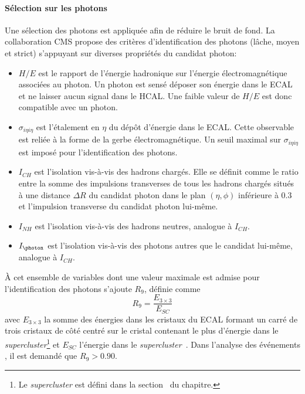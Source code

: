 \paragraph{Sélection sur les photons}
Une sélection des photons est appliquée afin de réduire le bruit de fond.
La collaboration CMS propose des critères d'identification des photons (lâche, moyen et strict) s'appuyant sur diverses propriétés du \og candidat \fg{} photon:
\begin{itemize}
\item $H/E$ est le rapport de l'énergie hadronique sur l'énergie électromagnétique associées au photon.
Un photon est sensé déposer son énergie dans le ECAL et ne laisser aucun signal dans le HCAL.
Une faible valeur de $H/E$ est donc compatible avec un photon.
\item $\sigma_{i\eta i\eta}$ est l'étalement en $\eta$ du dépôt d'énergie dans le ECAL.
Cette observable est reliée à la forme de la gerbe électromagnétique.
Un seuil maximal sur $\sigma_{i\eta i\eta}$ est imposé pour l'identification des photons.
\item $I_{CH}$ est l'isolation vis-à-vis des hadrons chargés.
Elle se définit comme le ratio entre la somme des impulsions transverses de tous les hadrons chargés situés à une distance $\Delta R$ du candidat photon dans le plan $(\eta,\phi)$ inférieure à \num{0.3} et l'impulsion transverse du candidat photon lui-même.
\item $I_{NH}$ est l'isolation vis-à-vis des hadrons neutres, analogue à $I_{CH}$.
\item $I_{\photon}$ est l'isolation vis-à-vis des photons autres que le candidat lui-même, analogue à $I_{CH}$.
\end{itemize}
À cet ensemble de variables dont une valeur maximale est admise pour l'identification des photons s'ajoute $R_9$, définie comme
\begin{equation}
R_9 = \frac{E_{3\times3}}{E_{SC}}
\label{eq-R9_definition}
\end{equation}
avec
$E_{3\times3}$ la somme des énergies dans les cristaux du ECAL formant un carré de trois cristaux de côté centré sur le cristal contenant le plus d'énergie dans le \emph{supercluster}\footnote{Le \emph{supercluster} est défini dans la section~ du chapitre.}
et
$E_{SC}$
l'énergie dans le \emph{supercluster}~\cite{photon_ID_2015}.
Dans l'analyse des événements \Gjets, il est demandé que $R_9 > \num{0.90}$.
